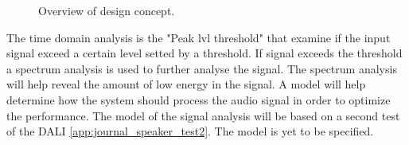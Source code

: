 \begin{figure}[H]
\centering
{}
\scalebox{0.8}{
}
\caption{Overview of design concept.}
\label{fig:signal_analysis_fig}
\end{figure}

The time domain analysis is the "Peak lvl threshold" that examine if the input signal exceed a certain level setted by a threshold. If signal exceeds the threshold a spectrum analysis is used to further analyse the signal. The spectrum analysis will help reveal the amount of low energy in the signal. A model will help determine how the system should process the audio signal in order to optimize the performance. The model of the signal analysis will be based on a second test of the DALI \autoref{app:journal_speaker_test2}. The model is yet to be specified.

























